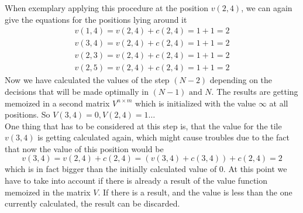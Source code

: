 \documentclass[conference]{IEEEtran}
\begin{document}
When exemplary applying this procedure at the position $v(2,4)$, we can again give the equations for the positions lying around it
\begin{align}
v(1,4) = v(2,4) + c(2,4) = 1 + 1 = 2\\
v(3,4) = v(2,4) + c(2,4) = 1 + 1 = 2\\
v(2,3) = v(2,4) + c(2,4) = 1 + 1 = 2\\
v(2,5) = v(2,4) + c(2,4) = 1 + 1 = 2
\end{align}
Now we have calculated the values of the step $(N-2)$ depending on the decisions that will be made optimally in $(N-1) \text{ and } N$. The results are getting memoized in a second matrix $V^{n \times m}$ which is initialized with the value $\infty$ at all positions. So $V(3,4) = 0, V(2,4)=1 \dots$\\ 
One thing that has to be considered at this step is, that the value for the tile $v(3,4)$ is getting calculated again, which might cause troubles due to the fact that now the value of this position would be
\begin{equation}
v(3,4) = v(2,4) + c(2,4) = (v(3,4) + c(3,4)) + c(2,4) = 2
\end{equation}
which is in fact bigger than the initially calculated value of $0$. At this point we have to take into account if there is already a result of the value function memoized in the matrix $V$. If there is a result, and the value is less than the one currently calculated, the result can be discarded.\\
\end{document}
